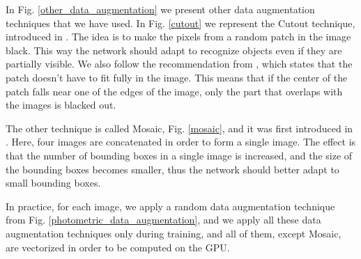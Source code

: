     
    In Fig. \ref{other_data_augmentation} we present other data augmentation techniques that we have used. In Fig. \ref{cutout} we represent the Cutout technique, introduced in \cite{cutout}. The idea is to make the pixels from a random patch in the image black. This way the network should adapt to recognize objects even if they are partially visible. We also follow the recommendation from \cite{cutout}, which states that the patch doesn't have to fit fully in the image. This means that if the center of the patch falls near one of the edges of the image, only the part that overlaps with the images is blacked out.
    
    The other technique is called Mosaic, Fig. \ref{mosaic}, and it was first introduced in \cite{yolov4}. Here, four images are concatenated in order to form a single image. The effect is that the number of bounding boxes in a single image is increased, and the size of the bounding boxes becomes smaller, thus the network should better adapt to small bounding boxes. 

    
    In practice, for each image, we apply a random data augmentation technique from Fig. \ref{photometric_data_augmentation}, and we apply all these data augmentation techniques only during training, and all of them, except Mosaic, are vectorized in order to be computed on the GPU.


